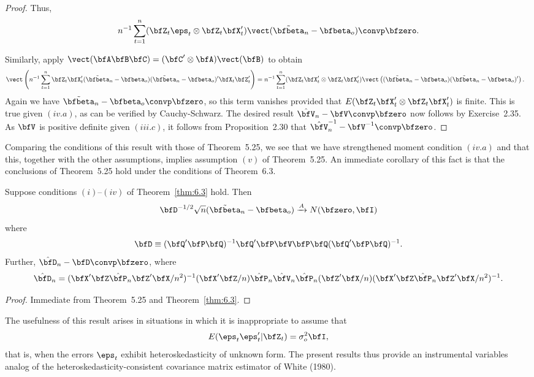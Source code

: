 \begin{proof}
Thus,
\[
  n^{-1}\sum_{t=1}^{n}(\bfZ_t\eps_t \otimes \bfZ_t\bfX_t')\vect(\tilde{\bfbeta}_n - \bfbeta_o) \convp \bfzero.
\]

Similarly, apply $\vect(\bfA\bfB\bfC) = (\bfC'\otimes\bfA)\vect(\bfB)$ to obtain
\begin{align*}
  \vect\left(n^{-1}\sum_{t=1}^{n}\bfZ_t\bfX_t'(\tilde{\bfbeta}_n - \bfbeta_o)(\tilde{\bfbeta}_n - \bfbeta_o)'\bfX_t\bfZ_t'\right)
  &= n^{-1}\sum_{t=1}^{n}(\bfZ_t\bfX_t' \otimes \bfZ_t\bfX_t')\vect\left((\tilde{\bfbeta}_n - \bfbeta_o)(\tilde{\bfbeta}_n - \bfbeta_o)'\right).
\end{align*}
Again we have $\tilde{\bfbeta}_n - \bfbeta_o \convp \bfzero$, so this term vanishes provided that $E(\bfZ_t\bfX_t' \otimes \bfZ_t\bfX_t')$ is finite. This is true given $(iv.a)$, as can be verified by Cauchy-Schwarz. The desired result $\hat{\bfV}_n - \bfV \convp \bfzero$ now follows by Exercise~2.35. As $\bfV$ is positive definite given $(iii.c)$, it follows from Proposition~2.30 that $\hat{\bfV}_n^{-1} - \bfV^{-1} \convp \bfzero$.
\end{proof}

Comparing the conditions of this result with those of Theorem~5.25, we see that we have strengthened moment condition $(iv.a)$ and that this, together with the other assumptions, implies assumption $(v)$ of Theorem~5.25. An immediate corollary of this fact is that the conclusions of Theorem~5.25 hold under the conditions of Theorem~6.3.

\begin{corollary}\label{cor:6.4}
Suppose conditions $(i)$--$(iv)$ of Theorem~\ref{thm:6.3} hold. Then
\[
  \bfD^{-1/2}\sqrt{n}(\tilde{\bfbeta}_n - \bfbeta_o) \xrightarrow{A} N(\bfzero,\bfI)
\]
where
\[
  \bfD \equiv (\bfQ'\bfP\bfQ)^{-1}\bfQ'\bfP\bfV\bfP\bfQ(\bfQ'\bfP\bfQ)^{-1}.
\]
Further, $\hat{\bfD}_n - \bfD \convp \bfzero$, where
\[
  \hat{\bfD}_n = (\bfX'\bfZ\hat{\bfP}_n\bfZ'\bfX/n^2)^{-1}(\bfX'\bfZ/n)\hat{\bfP}_n\hat{\bfV}_n\hat{\bfP}_n(\bfZ'\bfX/n)(\bfX'\bfZ\hat{\bfP}_n\bfZ'\bfX/n^2)^{-1}.
\]
\end{corollary}

\begin{proof}
Immediate from Theorem~5.25 and Theorem~\ref{thm:6.3}.
\end{proof}

The usefulness of this result arises in situations in which it is inappropriate to assume that
\[
  E(\eps_t\eps_t'|\bfZ_t) = \sigma_o^2\bfI,
\]
that is, when the errors $\eps_t$ exhibit heteroskedasticity of unknown form. The present results thus provide an instrumental variables analog of the heteroskedasticity-consistent covariance matrix estimator of White (1980).

